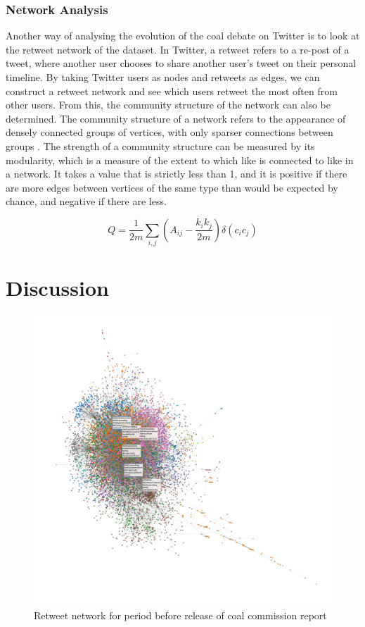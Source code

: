 \documentclass[10pt,twocolumn,twoside]{layout}
\begin{document}
\subsubsection*{Network Analysis}
Another way of analysing the evolution of the coal debate on Twitter is to look at the retweet network of the dataset. In Twitter, a retweet refers to a re-post of a tweet, where another user chooses to share another user's tweet on their personal timeline. By taking Twitter users as nodes and retweets as edges, we can construct a retweet network and see which users retweet the most often from other users. From this, the community structure of the network can also be determined. The community structure of a network refers to the appearance of densely connected groups of vertices, with only sparser connections between groups \cite{Newman8577}. The strength of a community structure can be measured by its modularity, which is a measure of the extent to which like is connected to like in a network. It takes a value that is strictly less than 1, and it is positive if there are more edges between vertices of the same type than would be expected by chance, and negative if there are less. %

\begin{equation}
\label{eq:modularity}
Q = \frac{1}{2m} \sum_{i,j} \left(A_{ij} - \frac{k_i k_j} {2m}\right) \delta (c_i c_j)
\end{equation} 	

\section*{Discussion} \label{sec:discussion}

\begin{figure} 
	\begin{center}
		\includegraphics[width=\linewidth]{figures/rt_network_ht_period4}
	\end{center}
	\caption{Retweet network for period before release of coal commission report}
	\label{fig:rt_network_bef}
\end{figure}
\end{document}

